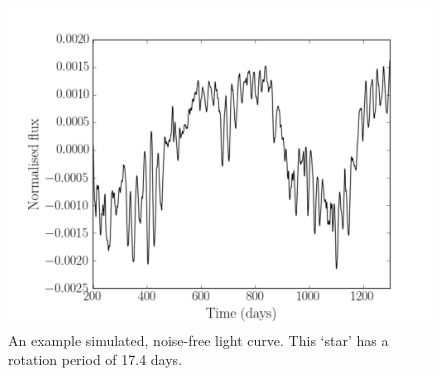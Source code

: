 

\begin{figure}
\begin{center}
\includegraphics[width=6in, clip=true]{figures/thesis_plot.pdf}
\caption[A simulated light curve.]
{An example simulated, noise-free light curve. This `star' has a
rotation period of 17.4 days.}
\label{fig:noise-free_lc}
\end{center}
\end{figure}

